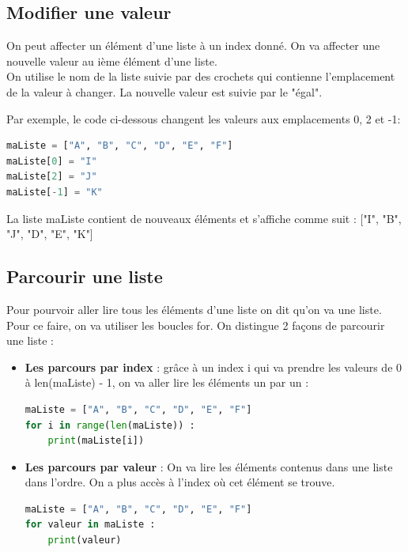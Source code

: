 \subsection*{Modifier une valeur}
On peut affecter un élément d'une liste à un index donné. On va affecter une nouvelle valeur au ième élément d'une liste.\\
On utilise le nom de la liste suivie par des crochets qui contienne l'emplacement de la valeur à changer. La nouvelle valeur est suivie par le "égal".
\begin{Comprendre}
Par exemple, le code ci-dessous changent les valeurs aux emplacements 0, 2 et -1:
\begin{lstlisting}[style=pythonstyle, language=python]
maListe = ["A", "B", "C", "D", "E", "F"]
maListe[0] = "I"
maListe[2] = "J"
maListe[-1] = "K"
\end{lstlisting}
La liste maListe contient de nouveaux éléments et s'affiche comme suit : ["I", "B", "J", "D", "E", "K"]
\end{Comprendre}

\subsection*{Parcourir une liste}
Pour pourvoir aller lire tous les éléments d'une liste on dit qu'on va  une liste. Pour ce faire, on va utiliser les boucles for. On distingue 2 façons de parcourir une liste :
\begin{itemize}
    \item \textbf{Les parcours par index} : grâce à un index i qui va prendre les valeurs de 0 à len(maListe) - 1, on va aller lire les éléments un par un :
\begin{lstlisting}[style=pythonstyle, language=python]
maListe = ["A", "B", "C", "D", "E", "F"]
for i in range(len(maListe)) :
    print(maListe[i])
\end{lstlisting}
    \item \textbf{Les parcours par valeur} : On va lire les éléments contenus dans une liste dans l'ordre. On a plus accès à l'index où cet élément se trouve.
\begin{lstlisting}[style=pythonstyle, language=python]
maListe = ["A", "B", "C", "D", "E", "F"]
for valeur in maListe :
    print(valeur)
\end{lstlisting}
\end{itemize}



